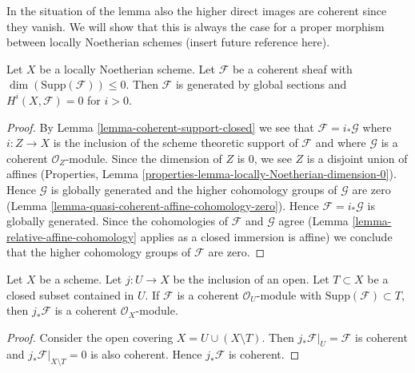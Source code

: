 \noindent
In the situation of the lemma also the higher direct images are
coherent since they vanish.
We will show that this is always the case for a proper morphism
between locally Noetherian schemes (insert future reference here).

\begin{lemma}
\label{lemma-coherent-support-dimension-0}
Let $X$ be a locally Noetherian scheme. Let $\mathcal{F}$
be a coherent sheaf with $\dim(\text{Supp}(\mathcal{F})) \leq 0$.
Then $\mathcal{F}$ is generated by global sections and
$H^i(X, \mathcal{F}) = 0$ for $i > 0$.
\end{lemma}

\begin{proof}
By Lemma \ref{lemma-coherent-support-closed} we see that
$\mathcal{F} = i_*\mathcal{G}$ where $i : Z \to X$ is the inclusion
of the scheme theoretic support of $\mathcal{F}$ and where $\mathcal{G}$
is a coherent $\mathcal{O}_Z$-module. Since the dimension of $Z$ is
$0$, we see $Z$ is a disjoint union of affines (Properties, Lemma
\ref{properties-lemma-locally-Noetherian-dimension-0}).
Hence $\mathcal{G}$ is globally generated and the higher
cohomology groups of $\mathcal{G}$ are zero
(Lemma \ref{lemma-quasi-coherent-affine-cohomology-zero}).
Hence $\mathcal{F} = i_*\mathcal{G}$ is globally generated.
Since the cohomologies of $\mathcal{F}$ and $\mathcal{G}$ agree
(Lemma \ref{lemma-relative-affine-cohomology} applies as a
closed immersion is affine)
we conclude that the higher cohomology groups of $\mathcal{F}$ are zero.
\end{proof}

\begin{lemma}
\label{lemma-pushforward-coherent-on-open}
Let $X$ be a scheme. Let $j : U \to X$ be the inclusion of an open.
Let $T \subset X$ be a closed subset contained in $U$.
If $\mathcal{F}$ is a coherent $\mathcal{O}_U$-module
with $\text{Supp}(\mathcal{F}) \subset T$, then
$j_*\mathcal{F}$ is a coherent $\mathcal{O}_X$-module.
\end{lemma}

\begin{proof}
Consider the open covering $X = U \cup (X \setminus T)$.
Then $j_*\mathcal{F}|_U = \mathcal{F}$ is coherent and
$j_*\mathcal{F}|_{X \setminus T} = 0$ is also coherent.
Hence $j_*\mathcal{F}$ is coherent.
\end{proof}














